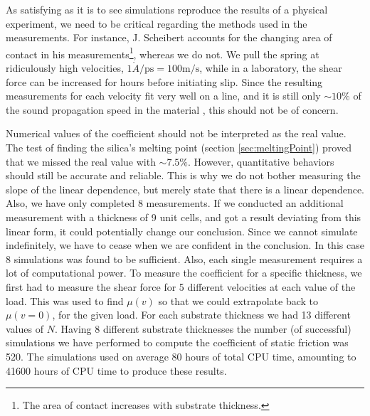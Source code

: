\documentclass[twoside,english]{uiofysmaster}
\begin{document}
As satisfying as it is to see simulations reproduce the results of a physical experiment, we need to be critical regarding the methods used in the measurements.
For instance, J. Scheibert accounts for the changing area of contact in his measurements\footnote{The area of contact increases with substrate thickness.}, whereas we do not.
We pull the spring at ridiculously high velocities, $1\mathring{A}/\text{ps} = 100\text{m/s}$, while in a laboratory, the shear force can be increased for hours before initiating slip. 
Since the resulting measurements for each velocity fit very well on a line, and it is still only $\sim10\%$ of the sound propagation speed in the material \cite{melosh2007}, this should not be of concern. 
 

Numerical values of the coefficient should not be interpreted as the real value. 
The test of finding the silica's melting point (section \ref{sec:meltingPoint}) proved that we missed the real value with $\sim7.5\%$.
However, quantitative behaviors should still be accurate and reliable.
This is why we do not bother measuring the slope of the linear dependence, but merely state that there is a linear dependence.   
Also, we have only completed 8 measurements. 
If we conducted an additional measurement with a thickness of 9 unit cells, and got a result deviating from this linear form, it could potentially change our conclusion. 
Since we cannot simulate indefinitely, we have to cease when we are confident in the conclusion.  
In this case 8 simulations was found to be sufficient. 
Also, each single measurement requires a lot of computational power. 
To measure the coefficient for a specific thickness, we first had to measure the shear force for 5 different velocities at each value of the load. 
This was used to find $\mu(v)$ so that we could extrapolate back to $\mu(v=0)$, for the given load. 
For each substrate thickness we had 13 different values of $N$.
Having 8 different substrate thicknesses the number (of successful) simulations we have performed to compute the coefficient of static friction was 520. 
The simulations used on average 80 hours of total CPU time, amounting to 41600 hours of CPU time to produce these results.
\end{document}
